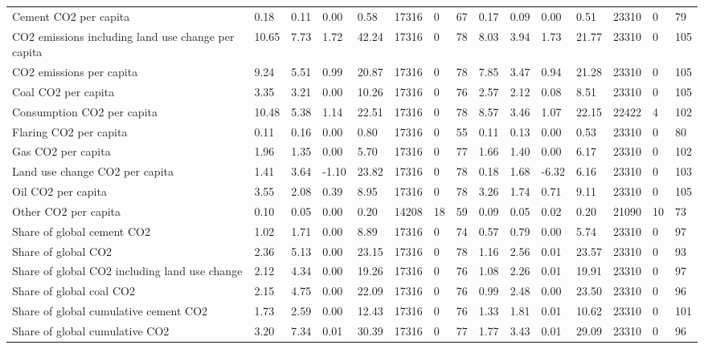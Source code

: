 \begin{longtable}{lllllllllllllll}
\addlinespace
Cement CO2 per capita & 0.18 & 0.11 & 0.00 & 0.58 & 17316 & 0 & 67 & 0.17 & 0.09 & 0.00 & 0.51 & 23310 & 0 & 79\\
CO2 emissions including land use change per capita & 10.65 & 7.73 & 1.72 & 42.24 & 17316 & 0 & 78 & 8.03 & 3.94 & 1.73 & 21.77 & 23310 & 0 & 105\\
CO2 emissions per capita & 9.24 & 5.51 & 0.99 & 20.87 & 17316 & 0 & 78 & 7.85 & 3.47 & 0.94 & 21.28 & 23310 & 0 & 105\\
Coal CO2 per capita & 3.35 & 3.21 & 0.00 & 10.26 & 17316 & 0 & 76 & 2.57 & 2.12 & 0.08 & 8.51 & 23310 & 0 & 105\\
Consumption CO2 per capita & 10.48 & 5.38 & 1.14 & 22.51 & 17316 & 0 & 78 & 8.57 & 3.46 & 1.07 & 22.15 & 22422 & 4 & 102\\
\addlinespace
Flaring CO2 per capita & 0.11 & 0.16 & 0.00 & 0.80 & 17316 & 0 & 55 & 0.11 & 0.13 & 0.00 & 0.53 & 23310 & 0 & 80\\
Gas CO2 per capita & 1.96 & 1.35 & 0.00 & 5.70 & 17316 & 0 & 77 & 1.66 & 1.40 & 0.00 & 6.17 & 23310 & 0 & 102\\
Land use change CO2 per capita & 1.41 & 3.64 & -1.10 & 23.82 & 17316 & 0 & 78 & 0.18 & 1.68 & -6.32 & 6.16 & 23310 & 0 & 103\\
Oil CO2 per capita & 3.55 & 2.08 & 0.39 & 8.95 & 17316 & 0 & 78 & 3.26 & 1.74 & 0.71 & 9.11 & 23310 & 0 & 105\\
Other CO2 per capita & 0.10 & 0.05 & 0.00 & 0.20 & 14208 & 18 & 59 & 0.09 & 0.05 & 0.02 & 0.20 & 21090 & 10 & 73\\
\addlinespace
Share of global cement CO2 & 1.02 & 1.71 & 0.00 & 8.89 & 17316 & 0 & 74 & 0.57 & 0.79 & 0.00 & 5.74 & 23310 & 0 & 97\\
Share of global CO2 & 2.36 & 5.13 & 0.00 & 23.15 & 17316 & 0 & 78 & 1.16 & 2.56 & 0.01 & 23.57 & 23310 & 0 & 93\\
Share of global CO2 including land use change & 2.12 & 4.34 & 0.00 & 19.26 & 17316 & 0 & 76 & 1.08 & 2.26 & 0.01 & 19.91 & 23310 & 0 & 97\\
Share of global coal CO2 & 2.15 & 4.75 & 0.00 & 22.09 & 17316 & 0 & 76 & 0.99 & 2.48 & 0.00 & 23.50 & 23310 & 0 & 96\\
Share of global cumulative cement CO2 & 1.73 & 2.59 & 0.00 & 12.43 & 17316 & 0 & 76 & 1.33 & 1.81 & 0.01 & 10.62 & 23310 & 0 & 101\\
\addlinespace
Share of global cumulative CO2 & 3.20 & 7.34 & 0.01 & 30.39 & 17316 & 0 & 77 & 1.77 & 3.43 & 0.01 & 29.09 & 23310 & 0 & 96\\

\end{longtable}
